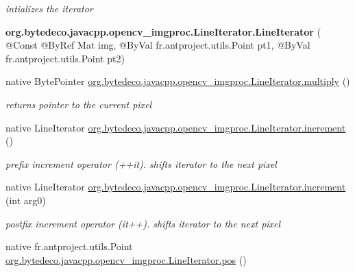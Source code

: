 \begin{DoxyCompactItemize}
\begin{DoxyCompactList}\small\item\em intializes the iterator \end{DoxyCompactList}\item 
\mbox{\label{group__imgproc_ga17055ede04995a70651678322cf7bc69}} 
{\bfseries org.\+bytedeco.\+javacpp.\+opencv\+\_\+imgproc.\+Line\+Iterator.\+Line\+Iterator} ( @Const @By\+Ref Mat img, @By\+Val fr.antproject.utils.Point pt1, @By\+Val fr.antproject.utils.Point pt2)
\item 
\mbox{\label{group__imgproc_ga1a32d4fc28b174d1ae2f436bb13385be}} 
native Byte\+Pointer \hyperlink{group__imgproc_ga1a32d4fc28b174d1ae2f436bb13385be}{org.\+bytedeco.\+javacpp.\+opencv\+\_\+imgproc.\+Line\+Iterator.\+multiply} ()
\begin{DoxyCompactList}\small\item\em returns pointer to the current pixel \end{DoxyCompactList}\item 
\mbox{\label{group__imgproc_gaa0691a9f57bd9d78c104fccda8e2175f}} 
native Line\+Iterator \hyperlink{group__imgproc_gaa0691a9f57bd9d78c104fccda8e2175f}{org.\+bytedeco.\+javacpp.\+opencv\+\_\+imgproc.\+Line\+Iterator.\+increment} ()
\begin{DoxyCompactList}\small\item\em prefix increment operator (++it). shifts iterator to the next pixel \end{DoxyCompactList}\item 
\mbox{\label{group__imgproc_ga63d8d28be11ae7dc5174bed1378b026c}} 
native Line\+Iterator \hyperlink{group__imgproc_ga63d8d28be11ae7dc5174bed1378b026c}{org.\+bytedeco.\+javacpp.\+opencv\+\_\+imgproc.\+Line\+Iterator.\+increment} (int arg0)
\begin{DoxyCompactList}\small\item\em postfix increment operator (it++). shifts iterator to the next pixel \end{DoxyCompactList}\item 
\mbox{\label{group__imgproc_ga2eeb5802ad1e50df4b7d2fee4ec99f19}} 
native fr.antproject.utils.Point \hyperlink{group__imgproc_ga2eeb5802ad1e50df4b7d2fee4ec99f19}{org.\+bytedeco.\+javacpp.\+opencv\+\_\+imgproc.\+Line\+Iterator.\+pos} ()

\end{DoxyCompactItemize}
